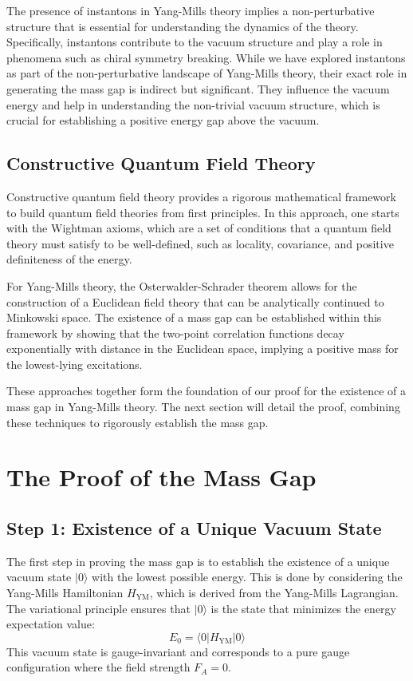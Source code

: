 \documentclass[11pt]{article}
\begin{document}
The presence of instantons in Yang-Mills theory implies a non-perturbative structure that is essential for understanding the dynamics of the theory. Specifically, instantons contribute to the vacuum structure and play a role in phenomena such as chiral symmetry breaking. While we have explored instantons as part of the non-perturbative landscape of Yang-Mills theory, their exact role in generating the mass gap is indirect but significant. They influence the vacuum energy and help in understanding the non-trivial vacuum structure, which is crucial for establishing a positive energy gap above the vacuum.

\subsection{Constructive Quantum Field Theory}
Constructive quantum field theory provides a rigorous mathematical framework to build quantum field theories from first principles. In this approach, one starts with the Wightman axioms, which are a set of conditions that a quantum field theory must satisfy to be well-defined, such as locality, covariance, and positive definiteness of the energy.

For Yang-Mills theory, the Osterwalder-Schrader theorem allows for the construction of a Euclidean field theory that can be analytically continued to Minkowski space. The existence of a mass gap can be established within this framework by showing that the two-point correlation functions decay exponentially with distance in the Euclidean space, implying a positive mass for the lowest-lying excitations.

These approaches together form the foundation of our proof for the existence of a mass gap in Yang-Mills theory. The next section will detail the proof, combining these techniques to rigorously establish the mass gap.

\section{The Proof of the Mass Gap}

\subsection{Step 1: Existence of a Unique Vacuum State}
The first step in proving the mass gap is to establish the existence of a unique vacuum state \( |0\rangle \) with the lowest possible energy. This is done by considering the Yang-Mills Hamiltonian \( H_{\text{YM}} \), which is derived from the Yang-Mills Lagrangian. The variational principle ensures that \( |0\rangle \) is the state that minimizes the energy expectation value:
\[
E_0 = \langle 0 | H_{\text{YM}} | 0 \rangle
\]
This vacuum state is gauge-invariant and corresponds to a pure gauge configuration where the field strength \( F_A = 0 \).
\end{document}
